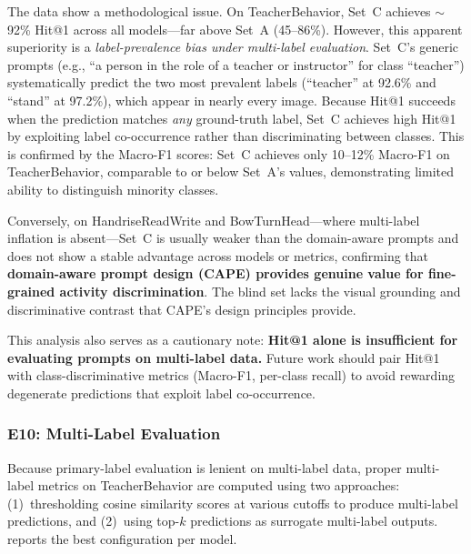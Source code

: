 \documentclass[symmetry,article,submit,pdftex,moreauthors]{Definitions/mdpi}
\begin{document}
The data show a methodological issue. On TeacherBehavior, Set~C achieves $\sim$92\% Hit@1 across all models---far above Set~A (45--86\%). However, this apparent superiority is a \emph{label-prevalence bias under multi-label evaluation}. Set~C's generic prompts (e.g., ``a person in the role of a teacher or instructor'' for class ``teacher'') systematically predict the two most prevalent labels (``teacher'' at 92.6\% and ``stand'' at 97.2\%), which appear in nearly every image. Because Hit@1 succeeds when the prediction matches \emph{any} ground-truth label, Set~C achieves high Hit@1 by exploiting label co-occurrence rather than discriminating between classes. This is confirmed by the Macro-F1 scores: Set~C achieves only 10--12\% Macro-F1 on TeacherBehavior, comparable to or below Set~A's values, demonstrating limited ability to distinguish minority classes.

Conversely, on HandriseReadWrite and BowTurnHead---where multi-label inflation is absent---Set~C is usually weaker than the domain-aware prompts and does not show a stable advantage across models or metrics, confirming that \textbf{domain-aware prompt design (CAPE) provides genuine value for fine-grained activity discrimination}. The blind set lacks the visual grounding and discriminative contrast that CAPE's design principles provide.

This analysis also serves as a cautionary note: \textbf{Hit@1 alone is insufficient for evaluating prompts on multi-label data.} Future work should pair Hit@1 with class-discriminative metrics (Macro-F1, per-class recall) to avoid rewarding degenerate predictions that exploit label co-occurrence.


\subsubsection{E10: Multi-Label Evaluation}
\label{sec:e10_multilabel}

Because primary-label evaluation is lenient on multi-label data, proper multi-label metrics on TeacherBehavior are computed using two approaches: (1)~thresholding cosine similarity scores at various cutoffs to produce multi-label predictions, and (2)~using top-$k$ predictions as surrogate multi-label outputs.  reports the best configuration per model.
\end{document}
